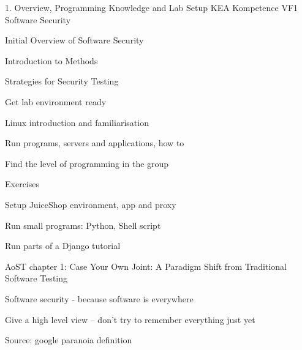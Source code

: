 \documentclass[Screen16to9,17pt]{foils}
\begin{document}
\mytitlepage
{1. Overview, Programming Knowledge and Lab Setup}
{KEA Kompetence VF1 Software Security}


\begin{list1}
\item Initial Overview of Software Security
\begin{list2}
\item Introduction to Methods
\item Strategies for Security Testing
\end{list2}
\item Get lab environment ready
\begin{list2}
\item Linux introduction and familiarisation
\item Run programs, servers and applications, how to
\item Find the level of programming in the group
\end{list2}

\item Exercises
\begin{list2}
\item Setup JuiceShop environment, app and proxy
\item Run small programs: Python, Shell script
\item Run parts of a Django tutorial
\end{list2}
\end{list1}


\begin{list1}
\item AoST chapter 1: Case Your Own Joint: A Paradigm Shift from Traditional Software Testing
\end{list1}



\begin{list1}
\item Software security - because software is everywhere
\item Give a high level view -- don't try to remember everything just yet
\end{list1}



Source: google paranoia definition
\end{document}
